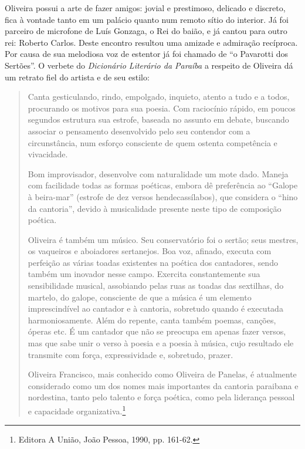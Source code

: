 Oliveira possui a arte de fazer amigos: jovial e prestimoso,
delicado e discreto, fica à vontade tanto em um palácio
quanto num remoto sítio do interior. Já foi parceiro de
microfone de Luís Gonzaga, o Rei do baião, e já cantou para
outro rei: Roberto Carlos. Deste encontro resultou uma
amizade e admiração recíproca. Por causa de sua melodiosa
voz de estentor já foi chamado de ``o Pavarotti dos
Sertões''. O verbete do \textit{Dicionário Literário da Paraíba} a respeito de
Oliveira dá um retrato fiel do artista e de seu estilo:

\begin{quote}

Canta gesticulando, rindo, empolgado, inquieto, atento
a tudo e a todos, procurando os motivos para sua poesia.
Com raciocínio rápido, em poucos segundos estrutura sua
estrofe, baseada no assunto em debate, buscando associar
o pensamento desenvolvido pelo seu contendor com a
circunstância, num esforço consciente de quem ostenta
competência e vivacidade.

Bom improvisador, desenvolve com naturalidade um
mote dado. Maneja com facilidade todas as formas poéticas,
embora dê preferência ao ``Galope à
beira-mar'' (estrofe de dez versos hendecassílabos), que considera o ``hino da
cantoria'', devido à musicalidade presente neste tipo de
composição poética.

Oliveira é também um músico. Seu conservatório foi o
sertão; seus mestres, os vaqueiros e aboiadores sertanejos. Boa
voz, afinado, executa com perfeição as várias toadas existentes
na poética dos cantadores, sendo também um inovador nesse
campo. Exercita constantemente sua sensibilidade musical,
assobiando pelas ruas as toadas das sextilhas, do martelo, do
galope, consciente de que a música é um elemento
imprescindível ao cantador e à cantoria, sobretudo quando é
executada harmoniosamente. Além do repente, canta também
poemas, canções, óperas etc. É um cantador que não se
preocupa em apenas fazer versos, mas que sabe unir o verso à
poesia e a poesia à música, cujo resultado ele transmite com
força, expressividade e, sobretudo, prazer.

Oliveira Francisco, mais conhecido como Oliveira de
Panelas, é atualmente considerado como um dos nomes
mais importantes da cantoria paraibana e nordestina, tanto
pelo talento e força poética, como pela liderança pessoal e
capacidade organizativa.\footnote{ Editora A União, João Pessoa, 1990, pp. 161-62.}

\end{quote}

